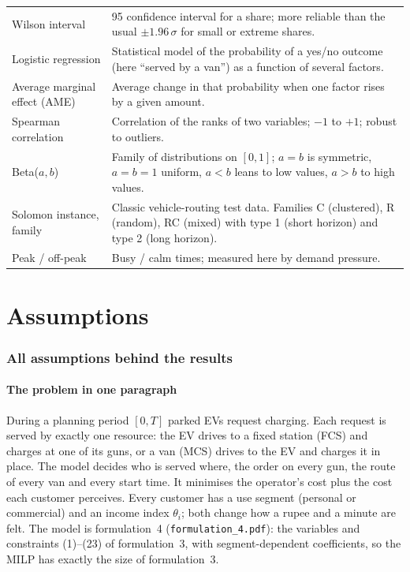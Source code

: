 \begin{xltabular}{\textwidth}{@{}>{\raggedright\arraybackslash}p{4.0cm}X@{}}
Wilson interval & 95\pct{} confidence interval for a share; more reliable than the usual $\pm1.96\,\sigma$ for small or extreme shares. \\
Logistic regression & Statistical model of the probability of a yes/no outcome (here ``served by a van'') as a function of several factors. \\
Average marginal effect (AME) & Average change in that probability when one factor rises by a given amount. \\
Spearman correlation & Correlation of the ranks of two variables; $-1$ to $+1$; robust to outliers. \\
Beta($a,b$) & Family of distributions on $[0,1]$; $a=b$ is symmetric, $a=b=1$ uniform, $a<b$ leans to low values, $a>b$ to high values. \\
Solomon instance, family & Classic vehicle-routing test data. Families C (clustered), R (random), RC (mixed) with type 1 (short horizon) and type 2 (long horizon). \\
Peak / off-peak & Busy / calm times; measured here by demand pressure. \\
\bottomrule
\end{xltabular}

\clearpage
\part{Assumptions}
\section{All assumptions behind the results}
\label{sec:assumptions}

\subsection{The problem in one paragraph}
During a planning period $[0,T]$ parked EVs request charging. Each request is served by exactly one resource: the EV drives to a fixed station (FCS) and charges at one of its guns, or a van (MCS) drives to the EV and charges it in place. The model decides who is served where, the order on every gun, the route of every van and every start time. It minimises the operator's cost plus the cost each customer perceives. Every customer has a use segment (personal or commercial) and an income index $\theta_i$; both change how a rupee and a minute are felt. The model is formulation~4 (\texttt{formulation\_4.pdf}): the variables and constraints (1)--(23) of formulation~3, with segment-dependent coefficients, so the MILP has exactly the size of formulation~3.

